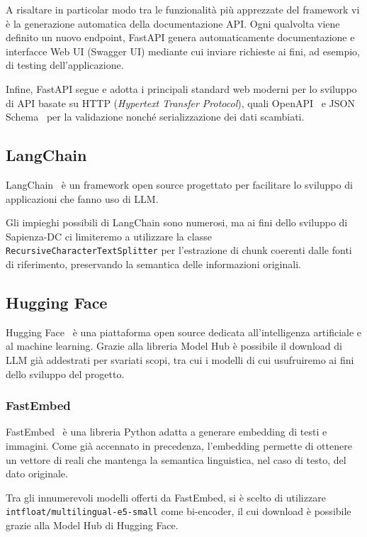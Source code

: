 A risaltare in particolar modo tra le funzionalità più apprezzate del framework vi è la generazione automatica della documentazione API. Ogni qualvolta viene definito un nuovo endpoint, FastAPI genera automaticamente documentazione e interfacce Web UI (Swagger UI) mediante cui inviare richieste ai fini, ad esempio, di testing dell'applicazione.

Infine, FastAPI segue e adotta i principali standard web moderni per lo sviluppo di API basate su HTTP (\textit{Hypertext Transfer Protocol}), quali OpenAPI~\cite{openapi_docs} e JSON Schema~\cite{jsonschema_docs} per la validazione nonché serializzazione dei dati scambiati.    

\subsection{LangChain}
LangChain~\cite{langchain_docs} è un framework open source progettato per facilitare lo sviluppo di applicazioni che fanno uso di LLM.

Gli impieghi possibili di LangChain sono numerosi, ma ai fini dello sviluppo di Sapienza-DC ci limiteremo a utilizzare la classe \texttt{RecursiveCharacterTextSplitter} per l'estrazione di chunk coerenti dalle fonti di riferimento, preservando la semantica delle informazioni originali.   

\subsection{Hugging Face}
Hugging Face~\cite{huggingface_docs} è una piattaforma open source dedicata all'intelligenza artificiale e al machine learning. Grazie alla libreria Model Hub è possibile il download di LLM già addestrati per svariati scopi, tra cui i modelli di cui usufruiremo ai fini dello sviluppo del progetto.

\subsubsection{FastEmbed}
FastEmbed~\cite{fastembed_docs} è una libreria Python adatta a generare embedding di testi e immagini. Come già accennato in precedenza, l'embedding permette di ottenere un vettore di reali che mantenga la semantica linguistica, nel caso di testo, del dato originale.

Tra gli innumerevoli modelli offerti da FastEmbed, si è scelto di utilizzare \texttt{intfloat/multilingual-e5-small} come bi-encoder, il cui download è possibile grazie alla Model Hub di Hugging Face.

